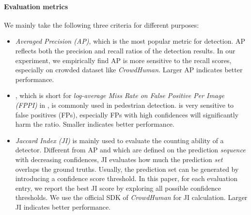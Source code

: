 \documentclass[10pt,twocolumn,letterpaper]{article}
\begin{document}
\paragraph{Evaluation metrics} We mainly take the following three criteria for different purposes:
\begin{itemize}
	\item \emph{Averaged Precision (AP)}, which is the most popular metric for detection. AP reflects both the precision and recall ratios of the detection results. In our experiment, we empirically find AP is more sensitive to the recall scores, especially on crowded dataset like \emph{CrowdHuman}. Larger AP indicates better performance.
	
	\item  \emph{} \cite{dollar2012pedestrian}, which is short for \emph{log-average Miss Rate on False Positive Per Image (FPPI)} in , is commonly used in pedestrian detection.  is very sensitive to false positives (FPs), especially FPs with high confidences will significantly harm the  ratio. Smaller  indicates better performance. 
	
	\item \emph{Jaccard Index (JI)} \cite{liu2016ssd} is mainly used to evaluate the counting ability of a detector. Different from AP and  which are defined on the prediction \emph{sequence} with decreasing confidences, JI evaluates how much the prediction \emph{set} overlaps the ground truths. Usually, the prediction set can be generated by introducing a confidence score threshold. In this paper, for each evaluation entry, we report the best JI score by exploring all possible confidence thresholds. We use the official SDK of \emph{CrowdHuman} \cite{shao2018crowdhuman} for JI calculation. Larger JI indicates better performance.
	
\end{itemize} 
 
 	
\end{document}
